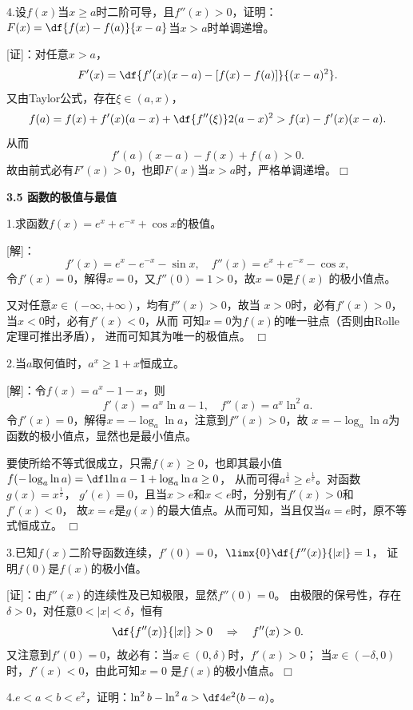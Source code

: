 \bigskip

4.设$f(x)$当$x\geq a$时二阶可导，且$f''(x)>0$，证明：
$F(x)=\df{f(x)-f(a)}{x-a}$当$x>a$时单调递增。

[证]：对任意$x>a$，
$$F'(x)=\df{f'(x)(x-a)-[f(x)-f(a)]}{(x-a)^2}.$$
又由Taylor公式，存在$\xi\in(a,x)$，
$$f(a)=f(x)+f'(x)(a-x)+\df{f''(\xi)}2(a-x)^2
>f(x)-f'(x)(x-a).$$
从而
$$f'(a)(x-a)-f(x)+f(a)>0.$$
故由前式必有$F'(x)>0$，也即$F(x)$当$x>a$时，严格单调递增。\hfill$\Box$

\begin{center}
	\bf 3.5 函数的极值与最值
\end{center}

\bigskip

1.求函数$f(x)=e^x+e^{-x}+\cos x$的极值。

[解]：
$$f'(x)=e^x-e^{-x}-\sin x,\quad f''(x)=e^x+e^{-x}-\cos x,$$
令$f'(x)=0$，解得$x=0$，又$f''(0)=1>0$，故$x=0$是$f(x)$
的极小值点。

又对任意$x\in(-\infty,+\infty)$，均有$f''(x)>0$，故当
$x>0$时，必有$f'(x)>0$，当$x<0$时，必有$f'(x)<0$，从而
可知$x=0$为$f(x)$的唯一驻点（否则由Rolle定理可推出矛盾），
进而可知其为唯一的极值点。
\hfill$\Box$

\bigskip

2.当$a$取何值时，$a^x\geq1+x$恒成立。

[解]：令$f(x)=a^x-1-x$，则
$$f'(x)=a^x\ln a-1,\quad f''(x)=a^x\ln^2a.$$
令$f'(x)=0$，解得$x=-\log_a\ln a$，注意到$f''(x)>0$，故
$x=-\log_a\ln a$为函数的极小值点，显然也是最小值点。

要使所给不等式很成立，只需$f(x)\geq0$，也即其最小值
$f(-\log_a\ln a)=\df1{\ln a}-1+\log_a\ln a\geq0$，
从而可得$a^{\frac1a}\geq e^{\frac1e}$。对函数$g(x)=x^{\frac1x}$，
$g'(e)=0$，且当$x>e$和$x<e$时，分别有$f'(x)>0$和$f'(x)<0$，
故$x=e$是$g(x)$的最大值点。从而可知，当且仅当$a=e$时，原不等式恒成立。
\hfill$\Box$

\bigskip

3.已知$f(x)$二阶导函数连续，$f'(0)=0$，$\limx{0}\df{f''(x)}{|x|}=1$，
证明$f(0)$是$f(x)$的极小值。

[证]：由$f''(x)$的连续性及已知极限，显然$f''(0)=0$。
由极限的保号性，存在$\delta>0$，对任意$0<|x|<\delta$，恒有
$$\df{f''(x)}{|x|}>0\quad
\Rightarrow\quad f''(x)>0.$$
又注意到$f'(0)=0$，故必有：当$x\in(0,\delta)$时，$f'(x)>0$；
当$x\in(-\delta,0)$时，$f'(x)<0$，由此可知$x=0$
是$f(x)$的极小值点。\hfill$\Box$

\bigskip

4.$e<a<b<e^2$，证明：$\ln^2b-\ln^2a>\df4{e^2}(b-a)$。

